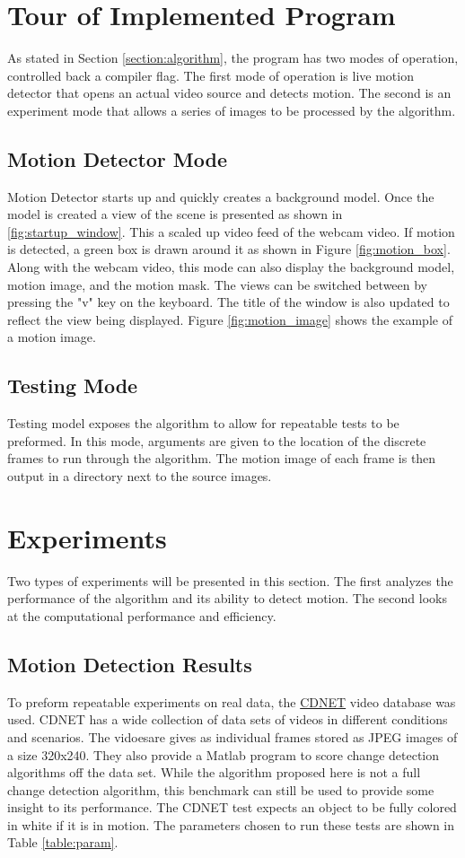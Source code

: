 \documentclass[journal]{IEEEtran}
\begin{document}
\section{Tour of Implemented Program}
\label{section:program}
As stated in Section \ref{section:algorithm}, the program has two modes of operation, controlled back a compiler
flag. The first mode of operation is live motion detector that opens an actual video source and detects motion.
The second is an experiment mode that allows a series of images to be processed by the algorithm.

\subsection{Motion Detector Mode}
Motion Detector starts up and quickly creates a background model. Once the model is created a view of the scene
is presented as shown in \ref{fig:startup_window}. This a scaled up video feed of the webcam video. If motion
is detected, a green box is drawn around it as shown in Figure \ref{fig:motion_box}. Along with the webcam video,
this mode can also display the background model, motion image, and the motion mask. The views can be switched
between by pressing the "v" key on the keyboard. The title of the window is also updated to reflect the view
being displayed. Figure \ref{fig:motion_image} shows the example of a motion image.


\subsection{Testing Mode}
Testing model exposes the algorithm to allow for repeatable tests to be preformed. In this mode, arguments
are given to the location of the discrete frames to run through the algorithm. The motion image of each frame
is then output in a directory next to the source images. 

\section{Experiments}
\label{section:experiments}
Two types of experiments will be presented in this section. The first analyzes the performance 
of the algorithm and its ability to detect motion. The second looks at the computational 
performance and efficiency. 

\subsection{Motion Detection Results}
To preform repeatable experiments on real data, the \href{http://changedetection.net/}{CDNET} video 
database was used. CDNET has a wide collection of data sets of videos in different conditions and 
scenarios. The vidoesare gives as individual frames stored as JPEG images of a size 320x240.
They also provide a Matlab  program to score change detection algorithms off the data set.
While the algorithm proposed here is not a full change detection algorithm, this benchmark 
can still be used to provide some insight to its performance. The CDNET test expects an object 
to be fully colored in white if it is in motion. The parameters chosen to run these tests are 
shown in Table \ref{table:param}.
\end{document}
